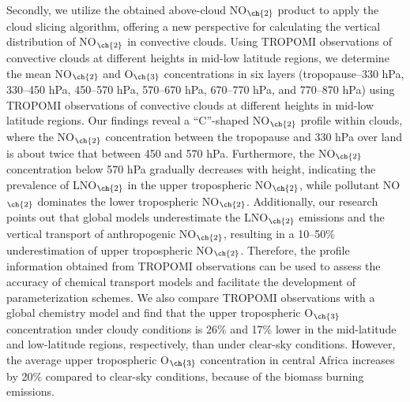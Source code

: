 {Secondly, we utilize the obtained above-cloud NO$_{\ch{2}}$ product to apply the cloud slicing algorithm, offering a new perspective for calculating the vertical distribution of NO$_{\ch{2}}$ in convective clouds.
Using TROPOMI observations of convective clouds at different heights in mid-low latitude regions, we determine the mean NO$_{\ch{2}}$ and O$_{\ch{3}}$ concentrations in six layers (tropopause--330 hPa, 330--450 hPa, 450--570 hPa, 570--670 hPa, 670--770 hPa, and 770--870 hPa) using TROPOMI observations of convective clouds at different heights in mid-low latitude regions.
Our findings reveal a ``C''-shaped NO$_{\ch{2}}$ profile within clouds, where the NO$_{\ch{2}}$ concentration between the tropopause and 330 hPa over land is about twice that between 450 and 570 hPa.
Furthermore, the NO$_{\ch{2}}$ concentration below 570 hPa gradually decreases with height, indicating the prevalence of LNO$_{\ch{2}}$ in the upper tropospheric NO$_{\ch{2}}$, while pollutant NO$_{\ch{2}}$ dominates the lower tropospheric NO$_{\ch{2}}$.
Additionally, our research points out that global models underestimate the LNO$_{\ch{2}}$ emissions and the vertical transport of anthropogenic NO$_{\ch{2}}$, resulting in a 10--50\% underestimation of upper tropospheric NO$_{\ch{2}}$.
Therefore, the profile information obtained from TROPOMI observations can be used to assess the accuracy of chemical transport models and facilitate the development of parameterization schemes.
We also compare TROPOMI observations with a global chemistry model and find that the upper tropospheric O$_{\ch{3}}$ concentration under cloudy conditions is 26\% and 17\% lower in the mid-latitude and low-latitude regions, respectively, than under clear-sky conditions.
However, the average upper tropospheric O$_{\ch{3}}$ concentration in central Africa increases by 20\% compared to clear-sky conditions, because of the biomass burning emissions.

}
